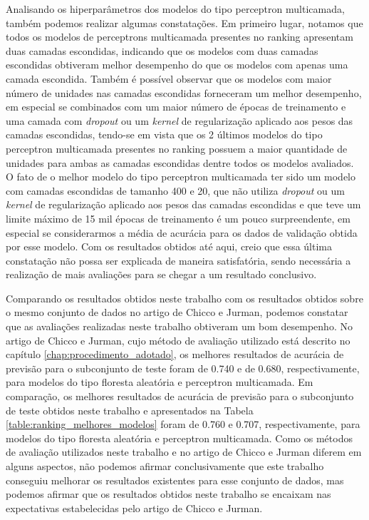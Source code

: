Analisando os hiperparâmetros dos modelos do tipo perceptron multicamada, também podemos realizar algumas constatações. Em primeiro lugar, notamos que todos os modelos de perceptrons multicamada presentes no ranking apresentam duas camadas escondidas, indicando que os modelos com duas camadas escondidas obtiveram melhor desempenho do que os modelos com apenas uma camada escondida. Também é possível observar que os modelos com maior número de unidades nas camadas escondidas forneceram um melhor desempenho, em especial se combinados com um maior número de épocas de treinamento e uma camada com \textit{dropout} ou um \textit{kernel} de regularização aplicado aos pesos das camadas escondidas, tendo-se em vista que os 2 últimos modelos do tipo perceptron multicamada presentes no ranking possuem a maior quantidade de unidades para ambas as camadas escondidas dentre todos os modelos avaliados. O fato de o melhor modelo do tipo perceptron multicamada ter sido um modelo com camadas escondidas de tamanho 400 e 20, que não utiliza \textit{dropout} ou um \textit{kernel} de regularização aplicado aos pesos das camadas escondidas e que teve um limite máximo de 15 mil épocas de treinamento é um pouco surpreendente, em especial se considerarmos a média de acurácia para os dados de validação obtida por esse modelo. Com os resultados obtidos até aqui, creio que essa última constatação não possa ser explicada de maneira satisfatória, sendo necessária a realização de mais avaliações para se chegar a um resultado conclusivo.

Comparando os resultados obtidos neste trabalho com os resultados obtidos sobre o mesmo conjunto de dados no artigo de Chicco e Jurman, podemos constatar que as avaliações realizadas neste trabalho obtiveram um bom desempenho. No artigo de Chicco e Jurman, cujo método de avaliação utilizado está descrito no capítulo \ref{chap:procedimento_adotado}, os melhores resultados de acurácia de previsão para o subconjunto de teste foram de 0.740 e de 0.680, respectivamente, para modelos do tipo floresta aleatória e perceptron multicamada. Em comparação, os melhores resultados de acurácia de previsão para o subconjunto de teste obtidos neste trabalho e apresentados na Tabela \ref{table:ranking_melhores_modelos} foram de 0.760 e 0.707, respectivamente, para modelos do tipo floresta aleatória e perceptron multicamada. Como os métodos de avaliação utilizados neste trabalho e no artigo de Chicco e Jurman diferem em alguns aspectos, não podemos afirmar conclusivamente que este trabalho conseguiu melhorar os resultados existentes para esse conjunto de dados, mas podemos afirmar que os resultados obtidos neste trabalho se encaixam nas expectativas estabelecidas pelo artigo de Chicco e Jurman.

